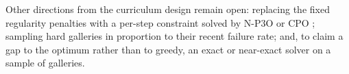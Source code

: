 \documentclass[11pt,a4paper]{article}
\begin{document}
Other directions from the curriculum design remain open: replacing the fixed regularity
penalties with a per-step constraint solved by N-P3O or CPO
\cite{lee2023constrained,achiam2017cpo}; sampling hard galleries in proportion to their recent
failure rate; and, to claim a gap to the optimum rather than to greedy, an exact or near-exact
solver \cite{couto2011,tozoni2016} on a sample of galleries.



\end{document}
